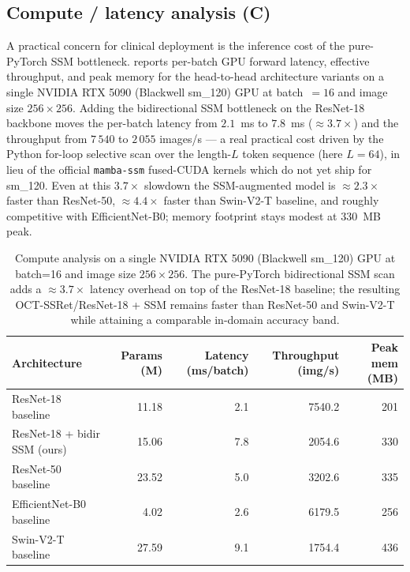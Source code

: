 \documentclass[5p]{elsarticle}
\begin{document}
\subsection{Compute / latency analysis (C)}
\label{sec:compute}
A practical concern for clinical deployment is the inference cost of the pure-PyTorch SSM bottleneck.  reports per-batch GPU forward latency, effective throughput, and peak memory for the head-to-head architecture variants on a single NVIDIA RTX 5090 (Blackwell sm\_120) GPU at batch~$=16$ and image size $256\times 256$. Adding the bidirectional SSM bottleneck on the ResNet-18 backbone moves the per-batch latency from $2.1$~ms to $7.8$~ms ($\approx 3.7\times$) and the throughput from $7\,540$ to $2\,055$ images/s --- a real practical cost driven by the Python for-loop selective scan over the length-$L$ token sequence (here $L=64$), in lieu of the official \texttt{mamba-ssm} fused-CUDA kernels which do not yet ship for sm\_120. Even at this $3.7\times$ slowdown the SSM-augmented model is $\approx 2.3\times$ faster than ResNet-50, $\approx 4.4\times$ faster than Swin-V2-T baseline, and roughly competitive with EfficientNet-B0; memory footprint stays modest at $330$~MB peak.

\begin{table}[t]
\centering\small
\caption{Compute analysis on a single NVIDIA RTX 5090 (Blackwell sm\_120) GPU at batch=16 and image size $256\times 256$. The pure-PyTorch bidirectional SSM scan adds a $\approx 3.7\times$ latency overhead on top of the ResNet-18 baseline; the resulting OCT-SSRet/ResNet-18 + SSM remains faster than ResNet-50 and Swin-V2-T while attaining a comparable in-domain accuracy band.}
\label{tab:compute}
\setlength{\tabcolsep}{4pt}
\begin{tabular}{l rrrr}
\toprule
Architecture & Params (M) & Latency (ms/batch) & Throughput (img/s) & Peak mem (MB) \\
\midrule
ResNet-18 baseline             &  11.18 &  2.1 & 7540.2 & 201 \\
ResNet-18 + bidir SSM (ours)   &  15.06 &  7.8 & 2054.6 & 330 \\
ResNet-50 baseline             &  23.52 &  5.0 & 3202.6 & 335 \\
EfficientNet-B0 baseline       &   4.02 &  2.6 & 6179.5 & 256 \\
Swin-V2-T baseline             &  27.59 &  9.1 & 1754.4 & 436 \\
\bottomrule
\end{tabular}
\end{table}
\end{document}
